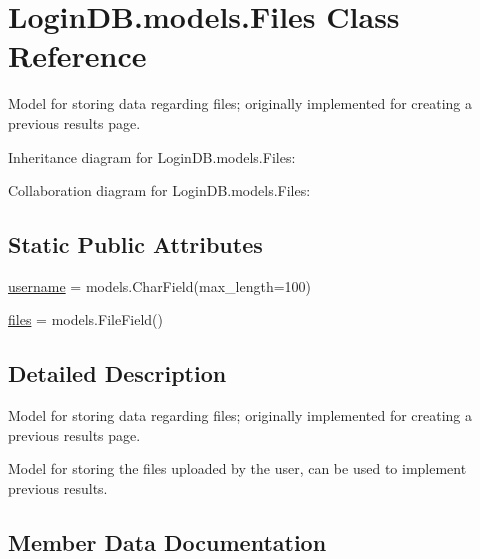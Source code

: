 \hypertarget{class_login_d_b_1_1models_1_1_files}{}\section{Login\+D\+B.\+models.\+Files Class Reference}
\label{class_login_d_b_1_1models_1_1_files}


Model for storing data regarding files; originally implemented for creating a previous results page.  




Inheritance diagram for Login\+D\+B.\+models.\+Files\+:


Collaboration diagram for Login\+D\+B.\+models.\+Files\+:
\subsection*{Static Public Attributes}
\begin{DoxyCompactItemize}
\item 
\hyperlink{class_login_d_b_1_1models_1_1_files_aabe1671e1c6fce28800164fa8b5fc54a}{username} = models.\+Char\+Field(max\+\_\+length=100)
\item 
\hyperlink{class_login_d_b_1_1models_1_1_files_ab0a94de0e11a0114327da80562745b0b}{files} = models.\+File\+Field()
\end{DoxyCompactItemize}


\subsection{Detailed Description}
Model for storing data regarding files; originally implemented for creating a previous results page. 

\begin{DoxyVerb}Model for storing the files uploaded by the user, can be used to implement previous results.
\end{DoxyVerb}
 

\subsection{Member Data Documentation}
\mbox{\label{class_login_d_b_1_1models_1_1_files_ab0a94de0e11a0114327da80562745b0b}} 
